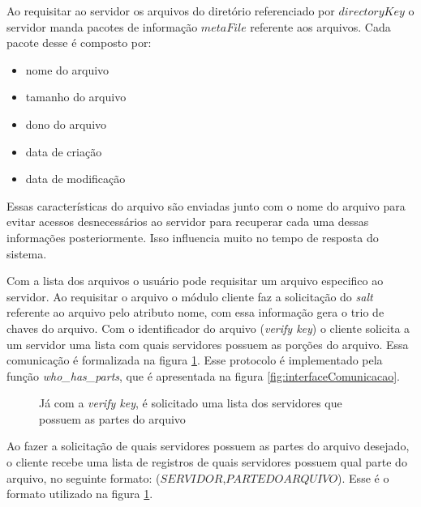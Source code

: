         Ao requisitar ao servidor os arquivos do diretório referenciado por $directoryKey$ o servidor manda pacotes de informação $metaFile$ referente aos arquivos. Cada pacote desse é composto por:
        \begin{itemize}
            \item nome do arquivo
            \item tamanho do arquivo
            \item dono do arquivo
            \item data de criação
            \item data de modificação
        \end{itemize}
        
        Essas características do arquivo são enviadas junto com o nome do arquivo para evitar acessos desnecessários ao servidor para recuperar cada uma dessas informações posteriormente. Isso influencia muito no tempo de resposta do sistema.
        
        Com a lista dos arquivos o usuário pode requisitar um arquivo especifico ao servidor. Ao requisitar o arquivo o módulo cliente faz a solicitação do \textit{salt} referente ao arquivo pelo atributo nome, com essa informação gera o trio de chaves do arquivo. Com o identificador do arquivo (\textit{verify key}) o cliente solicita a um servidor uma lista com quais servidores possuem as porções do arquivo. Essa comunicação é formalizada na figura \ref{fig:protWhoHasParts}. Esse protocolo é implementado pela função \textit{who\_has\_parts}, que é apresentada na figura \ref{fig:interfaceComunicacao}.
        
         \begin{figure}[!ht]

        \caption{Já com a \textit{verify key}, é solicitado uma lista dos servidores que possuem as partes do arquivo}
        \label{fig:protWhoHasParts}
        \end{figure}
        
        Ao fazer a solicitação de quais servidores possuem as partes do arquivo desejado, o cliente recebe uma lista de registros de quais servidores possuem qual parte do arquivo, no seguinte formato: ($SERVIDOR$,$PARTE DO ARQUIVO$). Esse é o formato utilizado na figura \ref{fig:protWhoHasParts}.
        
